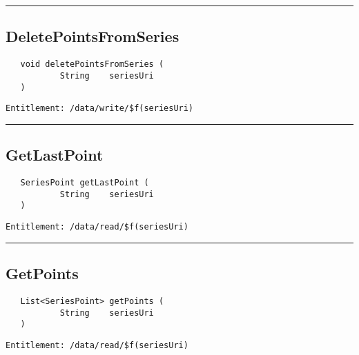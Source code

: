 \rule{12cm}{2pt}
\subsection{DeletePointsFromSeries}
\label{Api:DeletePointsFromSeries}
\begin{verbatim}
   void deletePointsFromSeries (
           String    seriesUri
   )
\end{verbatim}
\begin{Verbatim}[fontsize=\small, formatcom=\color{Maroon}]
  Entitlement: /data/write/$f(seriesUri)
\end{Verbatim}



\rule{12cm}{2pt}
\subsection{GetLastPoint}
\label{Api:GetLastPoint}
\begin{verbatim}
   SeriesPoint getLastPoint (
           String    seriesUri
   )
\end{verbatim}
\begin{Verbatim}[fontsize=\small, formatcom=\color{Maroon}]
  Entitlement: /data/read/$f(seriesUri)
\end{Verbatim}



\rule{12cm}{2pt}
\subsection{GetPoints}
\label{Api:GetPoints}
\begin{verbatim}
   List<SeriesPoint> getPoints (
           String    seriesUri
   )
\end{verbatim}
\begin{Verbatim}[fontsize=\small, formatcom=\color{Maroon}]
  Entitlement: /data/read/$f(seriesUri)
\end{Verbatim}




